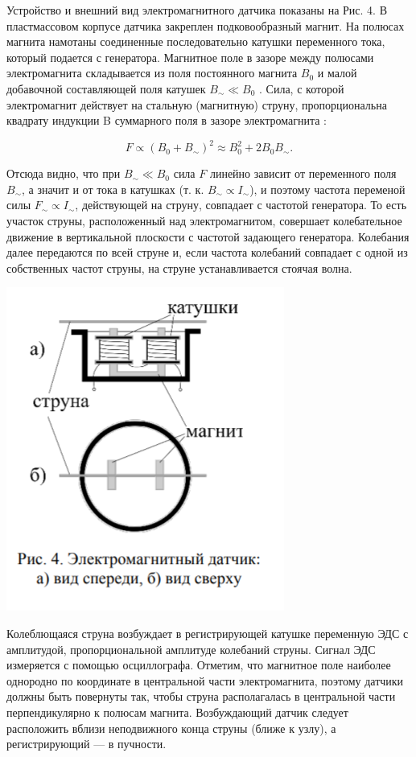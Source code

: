 \documentclass[a4paper, 12pt]{article} %
\begin{document}
Устройство и внешний вид электромагнитного датчика показаны на Рис. 4.
В пластмассовом корпусе датчика закреплен подковообразный магнит. На полюсах
магнита намотаны соединенные последовательно катушки переменного тока, который подается с генератора. Магнитное
поле в зазоре между полюсами электромагнита складывается из поля постоянного
магнита $B_0$ и малой добавочной составляющей поля катушек $B_{\sim} \ll B_0$ . Сила, с которой электромагнит действует на стальную
(магнитную) струну, пропорциональна
квадрату индукции B суммарного поля в
зазоре электромагнита :

\[ F\propto (B_0+ B_{\sim})^2 \approx B_0^2 + 2B_0B_{\sim} .\]

Отсюда видно, что при $B_{\sim} \ll B_0$ сила $F$ линейно зависит от переменного
поля $B_{\sim}$, а значит и от тока в катушках (т. к. $B_{\sim}  \propto I_{\sim}$), и поэтому частота переменой силы $ F_{\sim} \propto I_{\sim}$, действующей на струну, совпадает с частотой генератора. То есть участок струны, расположенный над электромагнитом, совершает колебательное движение в вертикальной плоскости с частотой задающего генератора. Колебания далее передаются по всей струне и,
если частота колебаний совпадает с одной из собственных частот струны, на
струне устанавливается стоячая волна. 

\begin{center}
    \includegraphics[scale=0.7]{1.4.5 5}
\end{center}

Колеблющаяся струна возбуждает в
регистрирующей катушке переменную ЭДС с амплитудой, пропорциональной амплитуде колебаний струны. Сигнал ЭДС измеряется с помощью осциллографа.
Отметим, что магнитное поле наиболее однородно по координате в центральной части электромагнита, поэтому датчики должны быть повернуты
так, чтобы струна располагалась в центральной части перпендикулярно к полюсам магнита. Возбуждающий датчик следует расположить вблизи неподвижного конца струны (ближе к узлу), а регистрирующий — в пучности.\\
\end{document}
